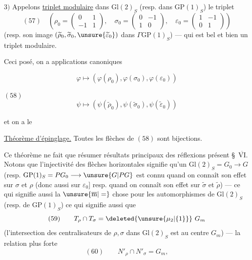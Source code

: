  $3)$ Appelons \uline{triplet modulaire}
\uline{} dans $\mathrm{Gl}(2)_S$
(resp. dans $\mathrm{GP}(1)_S$) le triplet
\[
(57)\quad\left(\rho_0=\begin{pmatrix}0&1\\-1&1\end{pmatrix},\quad
\sigma_0=\begin{pmatrix}0&-1\\1&0\end{pmatrix},\quad
\varepsilon_0=\begin{pmatrix}1&-1\\0&1\end{pmatrix}\right)
\]
(resp. son image $(\widetilde\rho_0,\widetilde\sigma_0,
\unsure{\widetilde\varepsilon_0})$ dans $\Gamma\mathrm{GP}(1)_S$) ---
qui est bel et bien un triplet modulaire.

Ceci posé, on a applications
canoniques


\[
\varphi\longmapsto(\varphi(\rho_0),\varphi(\sigma_0),\varphi(\varepsilon_0))
\]

$(58)$
\[
\psi\longmapsto(\psi(\widetilde\rho_0),\psi(\widetilde\sigma_0),
\psi(\widetilde\varepsilon_0))
\]

et on a le

\uline{Théorème d'épinglage.} Toutes les flèches de $(58)$ sont bijections.

Ce théorème ne fait que résumer 
 résultats principaux des réflexions
 présent \S\ \uline{$\overline{\mathrm{VI}}$}.
Notons que l'injectivité des flèches horizontales signifie 
qu'un 
$\mathrm{Gl}(2)_S=G_0\longrightarrow G$
(resp. $\mathrm{GP}(1)_S=PG_0\longrightarrow\unsure{G|PG}$
est connu quand on connaît son effet sur $\sigma$ et $\rho$
(donc aussi sur $\varepsilon_0$]
\unsure{$\leftarrow$} resp. quand on connaît son effet sur
$\widetilde\sigma$ et $\widetilde\rho$) --- ce qui signifie aussi
la $\unsure{\overline{\mathrm m}|=}$ chose pour les automorphismes de
$\mathrm{Gl}(2)_S$ (resp. de $\mathrm{GP}(1)_S$)
ce qui signifie aussi que
\[
(59)\qquad T_\rho\cap T_\sigma=\deleted{\unsure{\mu_2|\{1\}}}\ G_m
\]
(l'intersection des centralisateurs de $\rho,\sigma$ dans
$\mathrm{Gl}(2)_S$ est  au centre $G_m$) ---
 la relation plus forte
\[
(60)\qquad N'_\rho\cap N'_\sigma=G_m,
\]

